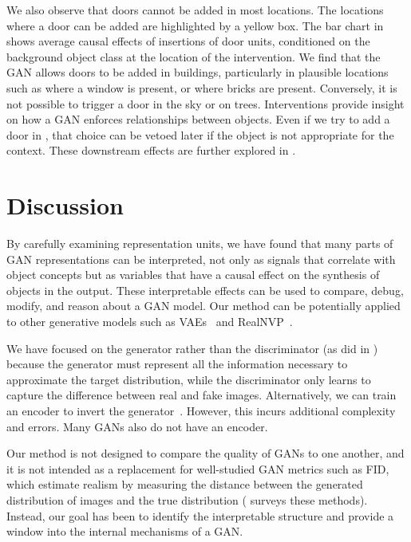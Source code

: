 \documentclass{article} %
\begin{document}
We also observe that doors cannot be added in most locations. The locations where a door can be added are highlighted by a yellow box.  The bar chart in  shows average causal effects of insertions of door units, conditioned on the background object class at the location of the intervention.  We find that the GAN allows doors to be added in buildings, particularly in plausible locations such as where a window is present, or where bricks are present.  Conversely, it is not possible to trigger a door in the sky or on trees. Interventions provide insight on how a GAN enforces relationships between objects.  Even if we try to add a door in , that choice can be vetoed later if the object is not appropriate for the context. These downstream effects are further explored in .
\section{Discussion}\vspace{-10pt}
By carefully examining representation units, we have found that many parts of GAN representations can be interpreted, not only as signals that correlate with object concepts but as variables that have a causal effect on the synthesis of objects in the output.  These interpretable effects can be used to compare, debug, modify, and reason about a GAN model. Our method can be potentially applied to other generative models such as VAEs~\citep{kingma2014auto} and RealNVP~\citep{dinh2017density}. %

We have focused on the generator rather than the discriminator (as did in \citet{radford2015unsupervised}) because the generator must represent all the information necessary to approximate the target distribution, while the discriminator only learns to capture the difference between real and fake images. Alternatively, we can train an encoder to invert the generator~\citep{donahue2016adversarial,dumoulin2016adversarially}.  However, this incurs additional complexity and errors. Many GANs also do not have an encoder.  

Our method is not designed to compare the quality of GANs to one another, and it is not intended as a replacement for well-studied GAN metrics such as FID, which estimate realism by measuring the distance between the generated distribution of images and the true distribution (\citet{borji2018pros} surveys these methods).  Instead, our goal has been to identify the interpretable structure and provide a window into the internal mechanisms of a GAN.
\end{document}
